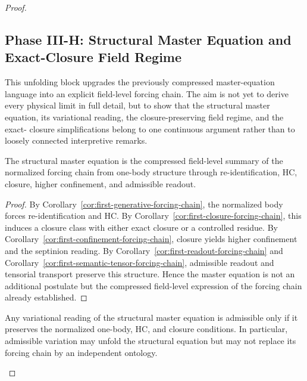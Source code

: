 \begin{proof}
\subsection*{Phase III-H: Structural Master Equation and Exact-Closure Field Regime}

This unfolding block upgrades the previously compressed master-equation language
into an explicit field-level forcing chain. The aim is not yet to derive every
physical limit in full detail, but to show that the structural master equation,
its variational reading, the closure-preserving field regime, and the exact-
closure simplifications belong to one continuous argument rather than to loosely
connected interpretive remarks.

\begin{lemma}
\label{lem:structural-master-equation}
The structural master equation is the compressed field-level summary of the
normalized forcing chain from one-body structure through re-identification, HC,
closure, higher confinement, and admissible readout.
\end{lemma}

\begin{proof}
By Corollary~\ref{cor:first-generative-forcing-chain}, the normalized body
forces re-identification and HC. By Corollary~\ref{cor:first-closure-forcing-chain},
this induces a closure class with either exact closure or a controlled residue.
By Corollary~\ref{cor:first-confinement-forcing-chain}, closure yields higher
confinement and the septinion reading. By Corollary~\ref{cor:first-readout-forcing-chain}
and Corollary~\ref{cor:first-semantic-tensor-forcing-chain}, admissible readout
and tensorial transport preserve this structure. Hence the master equation is not
an additional postulate but the compressed field-level expression of the forcing
chain already established.
\end{proof}

\begin{lemma}
\label{lem:variational-consistency}
Any variational reading of the structural master equation is admissible only if
it preserves the normalized one-body, HC, and closure conditions. In
particular, admissible variation may unfold the structural equation but may not
replace its forcing chain by an independent ontology.
\end{lemma}


\end{proof}
